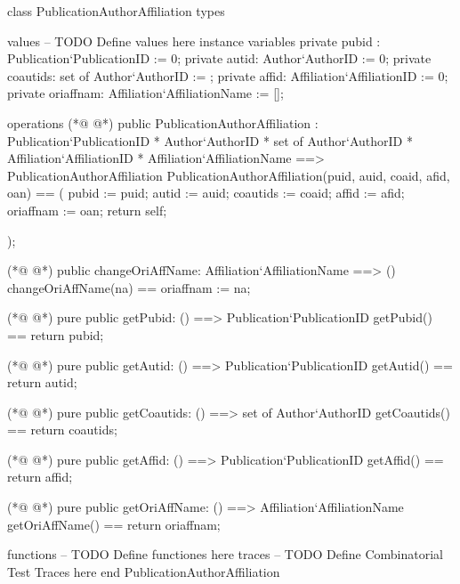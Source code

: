 \begin{vdmpp}[breaklines=true]
class PublicationAuthorAffiliation
types




values
-- TODO Define values here
instance variables
 private pubid : Publication`PublicationID := 0;
 private autid: Author`AuthorID := 0;
 private coautids: set of Author`AuthorID := {};
 private affid: Affiliation`AffiliationID := 0;
 private oriaffnam: Affiliation`AffiliationName := [];
 



operations
(*@
\label{PublicationAuthorAffiliation:20}
@*)
 public PublicationAuthorAffiliation : Publication`PublicationID * Author`AuthorID *
                    set of Author`AuthorID * Affiliation`AffiliationID * 
                    Affiliation`AffiliationName  ==> PublicationAuthorAffiliation
  PublicationAuthorAffiliation(puid, auid, coaid, afid, oan) ==
  (
  pubid := puid;
  autid := auid;
  coautids := coaid;
  affid := afid;
  oriaffnam := oan;
  return self;
  
  );
 
(*@
\label{changeOriAffName:34}
@*)
 public changeOriAffName: Affiliation`AffiliationName ==> ()
 changeOriAffName(na) ==
 oriaffnam :=  na;
 
(*@
\label{getPubid:38}
@*)
 pure public getPubid: () ==> Publication`PublicationID
 getPubid() == return pubid;
  
(*@
\label{getAutid:41}
@*)
 pure public getAutid: () ==> Publication`PublicationID
 getAutid() == return autid;
 
(*@
\label{getCoautids:44}
@*)
 pure public getCoautids: () ==> set of Author`AuthorID
 getCoautids() == return coautids; 
 
(*@
\label{getAffid:47}
@*)
 pure public getAffid: () ==> Publication`PublicationID
 getAffid() == return affid;
  
   
(*@
\label{getOriAffName:51}
@*)
 pure public getOriAffName: () ==> Affiliation`AffiliationName
 getOriAffName() == return oriaffnam;
 




functions
-- TODO Define functiones here
traces
-- TODO Define Combinatorial Test Traces here
end PublicationAuthorAffiliation
\end{vdmpp}
